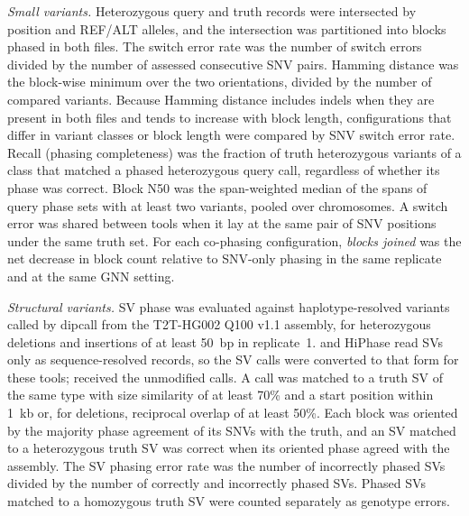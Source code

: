 \emph{Small variants.}  Heterozygous query and truth records were intersected by position and REF/ALT alleles, and the intersection was partitioned into blocks phased in both files.  The switch error rate was the number of switch errors divided by the number of assessed consecutive SNV pairs.  Hamming distance was the block-wise minimum over the two orientations, divided by the number of compared variants.  Because Hamming distance includes indels when they are present in both files and tends to increase with block length, configurations that differ in variant classes or block length were compared by SNV switch error rate.  Recall (phasing completeness) was the fraction of truth heterozygous variants of a class that matched a phased heterozygous query call, regardless of whether its phase was correct.  Block N50 was the span-weighted median of the spans of query phase sets with at least two variants, pooled over chromosomes.  A switch error was shared between tools when it lay at the same pair of SNV positions under the same truth set.  For each co-phasing configuration, \emph{blocks joined} was the net decrease in block count relative to SNV-only phasing in the same replicate and at the same GNN setting.

\emph{Structural variants.}  SV phase was evaluated against haplotype-resolved variants called by dipcall from the T2T-HG002 Q100 v1.1 assembly\cite{li2018dipcall,hansen2026q100}, for heterozygous deletions and insertions of at least 50~bp in replicate~1.  \whatshap and HiPhase read SVs only as sequence-resolved records, so the SV calls were converted to that form for these tools; \toolname received the unmodified calls.  A call was matched to a truth SV of the same type with size similarity of at least 70\% and a start position within 1~kb or, for deletions, reciprocal overlap of at least 50\%.  Each block was oriented by the majority phase agreement of its SNVs with the truth, and an SV matched to a heterozygous truth SV was correct when its oriented phase agreed with the assembly.  The SV phasing error rate was the number of incorrectly phased SVs divided by the number of correctly and incorrectly phased SVs.  Phased SVs matched to a homozygous truth SV were counted separately as genotype errors.

